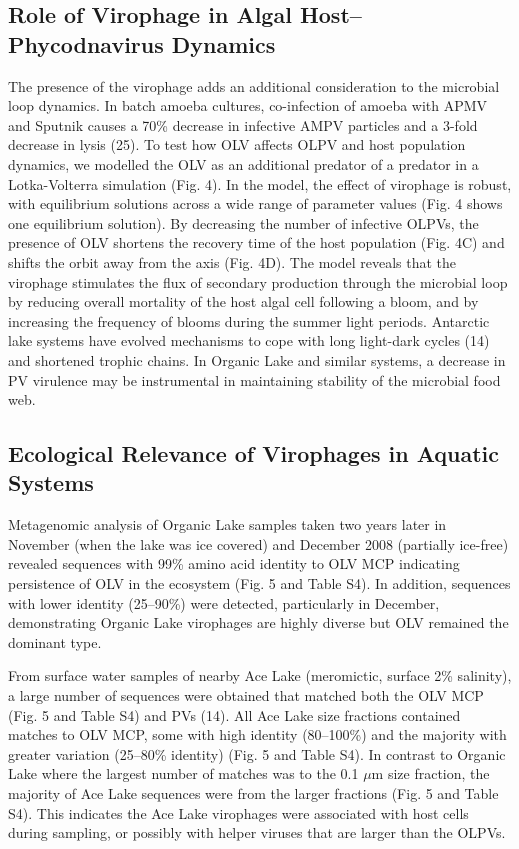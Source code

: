 \subsection[Virophage in Algal Host--Phycodnavirus Dynamics]{Role of Virophage in Algal Host--Phycodnavirus Dynamics}
The presence of the virophage adds an additional consideration to the microbial loop dynamics. 
In batch amoeba cultures, co-infection of amoeba with APMV and Sputnik causes a 70\% decrease in infective AMPV particles and a 3-fold decrease in lysis (25). 
To test how OLV affects OLPV and host population dynamics, we modelled the OLV as an additional predator of a predator in a Lotka-Volterra simulation (Fig. 4). 
In the model, the effect of virophage is robust, with equilibrium solutions across a wide range of parameter values (Fig. 4 shows one equilibrium solution). 
By decreasing the number of infective OLPVs, the presence of OLV shortens the recovery time of the host population (Fig. 4C) and shifts the orbit away from the axis (Fig. 4D). 
The model reveals that the virophage stimulates the flux of secondary production through the microbial loop by reducing overall mortality of the host algal cell following a bloom, and by increasing the frequency of blooms during the summer light periods. 
Antarctic lake systems have evolved mechanisms to cope with long light-dark cycles (14) and shortened trophic chains. 
In Organic Lake and similar systems, a decrease in PV virulence may be instrumental in maintaining stability of the microbial food web. 

\subsection{Ecological Relevance of Virophages in Aquatic Systems}
Metagenomic analysis of Organic Lake samples taken two years later in November (when the lake was ice covered) and December 2008 (partially ice-free) revealed sequences with 99\% amino acid identity to OLV MCP indicating persistence of OLV in the ecosystem (Fig. 5 and Table S4). 
In addition, sequences with lower identity (25--90\%) were detected, particularly in December, demonstrating Organic Lake virophages are highly diverse but OLV remained the dominant type. 

From surface water samples of nearby Ace Lake (meromictic, surface 2\% salinity), a large number of sequences were obtained that matched both the OLV MCP (Fig. 5 and Table S4) and PVs (14). 
All Ace Lake size fractions contained matches to OLV MCP, some with high identity (80--100\%) and the majority with greater variation (25--80\% identity) (Fig. 5 and Table S4). 
In contrast to Organic Lake where the largest number of matches was to the 0.1 $\mu$m size fraction, the majority of Ace Lake sequences were from the larger fractions (Fig. 5 and Table S4). 
This indicates the Ace Lake virophages were associated with host cells during sampling, or possibly with helper viruses that are larger than the OLPVs. 

